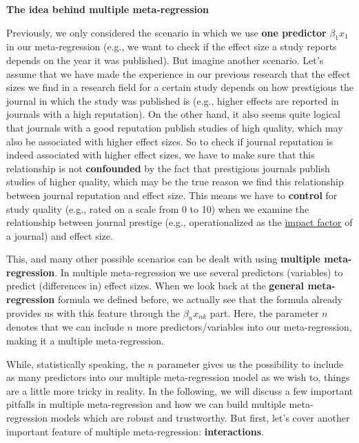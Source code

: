 \documentclass[]{book}
\begin{document}
\begin{rmdinfo}
\textbf{The idea behind multiple meta-regression}

Previously, we only considered the scenario in which we use \textbf{one
predictor} \(\beta_1x_1\) in our meta-regression (e.g., we want to check
if the effect size a study reports depends on the year it was
published). But imagine another scenario. Let's assume that we have made
the experience in our previous research that the effect sizes we find in
a research field for a certain study depends on how prestigious the
journal in which the study was published is (e.g., higher effects are
reported in journals with a high reputation). On the other hand, it also
seems quite logical that journals with a good reputation publish studies
of high quality, which may also be associated with higher effect sizes.
So to check if journal reputation is indeed associated with higher
effect sizes, we have to make sure that this relationship is not
\textbf{confounded} by the fact that prestigious journals publish
studies of higher quality, which may be the true reason we find this
relationship between journal reputation and effect size. This means we
have to \textbf{control} for study quality (e.g., rated on a scale from
0 to 10) when we examine the relationship between journal prestige
(e.g., operationalized as the
\href{https://en.wikipedia.org/wiki/Impact_factor}{impact factor} of a
journal) and effect size.

This, and many other possible scenarios can be dealt with using
\textbf{multiple meta-regression}. In multiple meta-regression we use
several predictors (variables) to predict (differences in) effect sizes.
When we look back at the \textbf{general meta-regression} formula we
defined before, we actually see that the formula already provides us
with this feature through the \(\beta_nx_{nk}\) part. Here, the
parameter \(n\) denotes that we can include \(n\) more
predictors/variables into our meta-regression, making it a multiple
meta-regression.

While, statistically speaking, the \(n\) parameter gives us the
possibility to include as many predictors into our multiple
meta-regression model as we wish to, things are a little more tricky in
reality. In the following, we will discuss a few important pitfalls in
multiple meta-regression and how we can build multiple meta-regression
models which are robust and trustworthy. But first, let's cover another
important feature of multiple meta-regression: \textbf{interactions}.
\end{rmdinfo}
\end{document}

